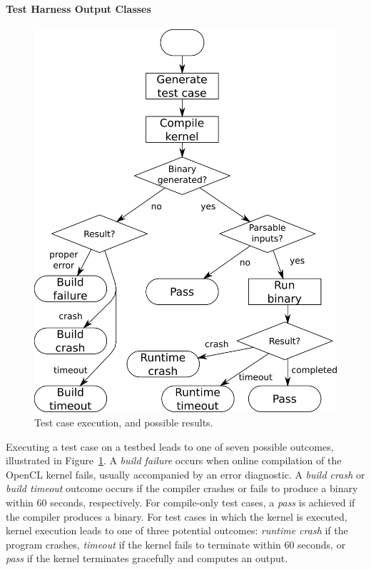 \paragraph*{Test Harness Output Classes}
\begin{figure}
  \centering %
  \includegraphics[width=\columnwidth]{img/testprocess-long}%
  \caption{%
 	  Test case execution, and possible results.%
  }%
  \label{fig:test-process} %
\end{figure}
Executing a test case on a testbed leads to one of seven possible outcomes, illustrated in Figure~\ref{fig:test-process}. 
A \emph{build failure} occurs when online compilation of the OpenCL kernel fails, usually accompanied by an error diagnostic. 
A \emph{build crash} or \emph{build timeout} outcome occurs if the compiler crashes or fails to produce a binary within 60 seconds, respectively. 
For compile-only test cases, a \emph{pass} is achieved if the compiler produces a binary. 
For test cases in which the kernel is executed, kernel execution leads to one of three potential outcomes: 
\emph{runtime crash} if the program crashes, 
\emph{timeout} if the kernel fails to terminate within 60 seconds, 
or \emph{pass} if the kernel terminates gracefully and computes an output.

